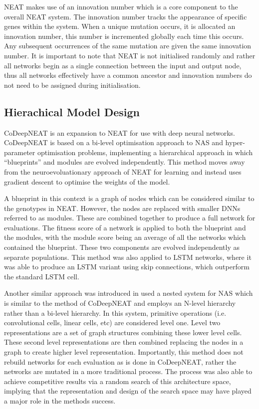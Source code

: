 		NEAT makes use of an innovation number which is a core component to the overall NEAT system. The innovation number tracks the appearance of specific genes within the system. When a unique mutation occurs, it is allocated an innovation number, this number is incremented globally each time this occurs. Any subsequent occurrences of the same mutation are given the same innovation number. It is important to note that NEAT is not initialised randomly and rather all networks begin as a single connection between the input and output node, thus all networks effectively have a common ancestor and innovation numbers do not need to be assigned during initialisation.


	

	\subsection{Hierachical Model Design}

		CoDeepNEAT \cite{25} is an expansion to NEAT for use with deep neural networks. CoDeepNEAT is based on a bi-level optimisation approach to NAS and hyper-parameter optimisation problems, implementing a hierarchical approach in which “blueprints” and modules are evolved independently. This method moves away from the neuroevoluationary approach of NEAT for learning and instead uses gradient descent to optimise the weights of the model.

		A blueprint in this context is a graph of nodes which can be considered similar to the genotypes in NEAT. However, the nodes are replaced with smaller DNNs referred to as modules. These are combined together to produce a full network for evaluations. The fitness score of a network is applied to both the blueprint and the modules, with the module score being an average of all the networks which contained the blueprint. These two components are evolved independently as separate populations. This method was also applied to LSTM networks, where it was able to produce an LSTM variant using skip connections, which outperform the standard LSTM cell.


		Another similar approach was introduced in \cite{4} used a nested system for NAS which is similar to the method of CoDeepNEAT and employs an N-level hierarchy rather than a bi-level hierarchy. In this system, primitive operations (i.e. convolutional cells, linear cells, etc) are considered level one. Level two representations are a set of graph structures combining these lower level cells. These second level representations are then combined replacing the nodes in a graph to create higher level representation. Importantly, this method does not rebuild networks for each evaluation as is done in CoDeepNEAT, rather the networks are mutated in a more traditional process. The process was also able to achieve competitive results via a random search of this architecture space, implying that  the representation and design of the search space may have played a major role in the methods success.  


